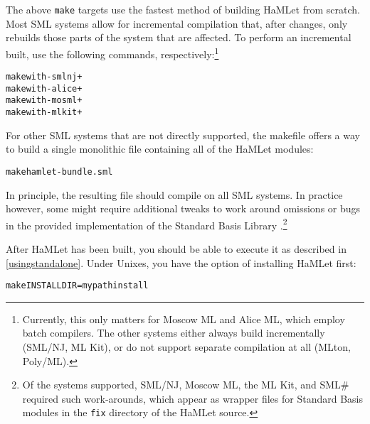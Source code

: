 \documentclass[twoside,titlepage]{article}
\newcommand{\void}[1]{}
\begin{document}
\void{
To compile under DOS-based systems you\void{ can either use the simple-minded {\tt make.bat} batch file that is included in the HaMLet distribution and fakes the commands above, or you} have to install some `make' substitute (e.g.\ via Cygwin) and modify the makefile according to the contained comments.\footnote{This does not properly work for Moscow ML currently.}
}

The above {\tt make} targets use the fastest method of building HaMLet from scratch. Most SML systems allow for incremental compilation that, after changes, only rebuilds those parts of the system that are affected. To perform an incremental built, use the following commands, respectively:\footnote{Currently, this only matters for Moscow ML and Alice ML, which employ batch compilers. The other systems either always build incrementally (SML/NJ, ML Kit), or do not support separate compilation at all (MLton, Poly/ML).}

\begin{quoting}
\begin{alltt}
make with-smlnj+
make with-alice+
make with-mosml+
make with-mlkit+
\end{alltt}
\end{quoting}

For other SML systems that are not directly supported, the makefile offers a way to build a single monolithic file containing all of the HaMLet modules:

\begin{quoting}
\begin{alltt}
make hamlet-bundle.sml
\end{alltt}
\end{quoting}

In principle, the resulting file should compile on all SML systems. In practice however, some might require additional tweaks to work around omissions or bugs in the provided implementation of the Standard Basis Library \cite{basis}.\footnote{Of the systems supported, SML/NJ, Moscow ML, the ML Kit, and SML\# required such work-arounds, which appear as wrapper files for Standard Basis modules in the {\tt fix} directory of the HaMLet source.}

After HaMLet has been built, you should be able to execute it as described in \ref{usingstandalone}. Under Unixes, you have the option of installing HaMLet first:

\begin{quoting}
\begin{alltt}
make INSTALLDIR=mypath install
\end{alltt}
\end{quoting}
\end{document}
